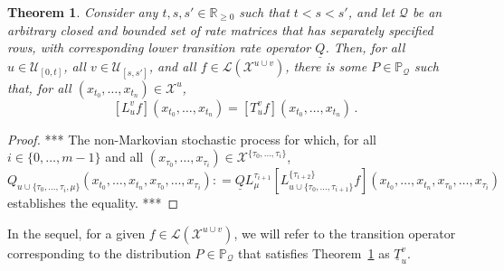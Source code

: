 \documentclass[a4paper,reqno]{amsart}
\newtheorem{theorem}{Theorem}
\newcommand{\reals}{\mathbb{R}}
\newcommand{\realsnonneg}{\reals_{\geq 0}}
\newcommand{\states}{\mathcal{X}}
\newcommand{\lt}{\underline{T}}
\newcommand{\gambles}{\mathcal{L}}
\newcommand{\lrate}{\underline{Q}}
\newcommand{\coloneqq}{:\!=}
\begin{document}
\begin{theorem}\label{theorem:nonmarkov_multi_variable_lower_envelope}
Consider any $t,s,s'\in\realsnonneg$ such that $t<s<s'$, and let $\mathcal{Q}$ be an arbitrary closed and bounded set of rate matrices that has separately specified rows, with corresponding lower transition rate operator $\lrate$. Then, for all $u\in\mathcal{U}_{[0,t]}$, all $v\in\mathcal{U}_{[s,s']}$, and all $f\in\gambles(\states^{u\cup v})$, there is some $P\in\mathbb{P}_\mathcal{Q}$ such that, for all $(x_{t_0},\ldots,x_{t_n})\in\states^u$,
\begin{equation*}
\left[L_u^v f\right](x_{t_0},\ldots,x_{t_n}) = \left[T_u^v f\right](x_{t_0},\ldots,x_{t_n})\,.
\end{equation*}
\end{theorem}
\begin{proof}
*** The non-Markovian stochastic process for which, for all $i\in\{0,\ldots,{m-1}\}$ and all $(x_{\tau_0},\ldots,x_{\tau_i})\in\states^{\{\tau_0,\ldots,\tau_i\}}$,
\begin{equation*}
Q_{u\cup\{\tau_0,\ldots,\tau_i,\mu\}}(x_{t_0},\ldots,x_{t_n},x_{\tau_0},\ldots,x_{\tau_i}) \coloneqq \lrate L_\mu^{\tau_{i+1}} \left[L_{u\cup\{\tau_0,\ldots,\tau_{i+1}\}}^{\{\tau_{i+2}\}}f\right](x_{t_0},\ldots,x_{t_n},x_{\tau_0},\ldots,x_{\tau_i})
\end{equation*}
establishes the equality. ***
\end{proof}



In the sequel, for a given $f\in\gambles(\states^{u\cup v})$, we will refer to the transition operator corresponding to the distribution $P\in\mathbb{P}_\mathcal{Q}$ that satisfies Theorem~\ref{theorem:nonmarkov_multi_variable_lower_envelope} as $\lt_u^v$.
\end{document}
